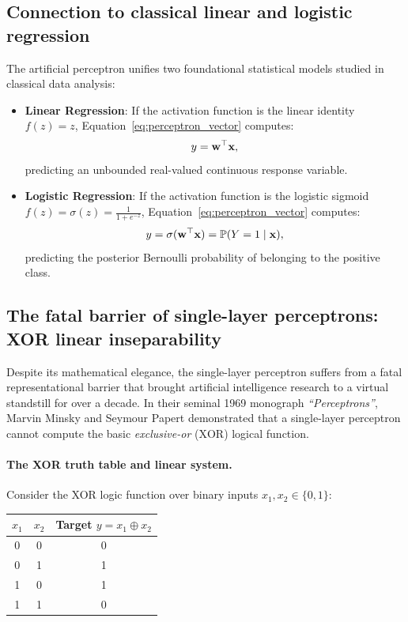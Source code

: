 \documentclass[../../main.tex]{subfiles}
\begin{document}
\subsection{Connection to classical linear and logistic regression}
The artificial perceptron unifies two foundational statistical models studied in classical data analysis:
\begin{itemize}
    \item \textbf{Linear Regression}: If the activation function is the linear identity $f(z) = z$, Equation~\eqref{eq:perceptron_vector} computes:
    \[
    y = \mathbf{w}^\top \mathbf{x},
    \]
    predicting an unbounded real-valued continuous response variable.
    \item \textbf{Logistic Regression}: If the activation function is the logistic sigmoid $f(z) = \sigma(z) = \frac{1}{1 + e^{-z}}$, Equation~\eqref{eq:perceptron_vector} computes:
    \[
    y = \sigma(\mathbf{w}^\top \mathbf{x}) = \mathbb{P}(Y = 1 \mid \mathbf{x}),
    \]
    predicting the posterior Bernoulli probability of belonging to the positive class.
\end{itemize}

\subsection{The fatal barrier of single-layer perceptrons: XOR linear inseparability}
\label{subsec:xor_inseparability}

Despite its mathematical elegance, the single-layer perceptron suffers from a fatal representational barrier that brought artificial intelligence research to a virtual standstill for over a decade. In their seminal 1969 monograph \textit{``Perceptrons''}, Marvin Minsky and Seymour Papert demonstrated that a single-layer perceptron cannot compute the basic \emph{exclusive-or} ($\text{XOR}$) logical function.

\paragraph{The XOR truth table and linear system.}
Consider the XOR logic function over binary inputs $x_1, x_2 \in \{0, 1\}$:
\begin{center}
\begin{tabular}{cc|c}
\toprule
$x_1$ & $x_2$ & Target $y = x_1 \oplus x_2$ \\
\midrule
0 & 0 & 0 \\
0 & 1 & 1 \\
1 & 0 & 1 \\
1 & 1 & 0 \\
\bottomrule
\end{tabular}
\end{center}
\end{document}
